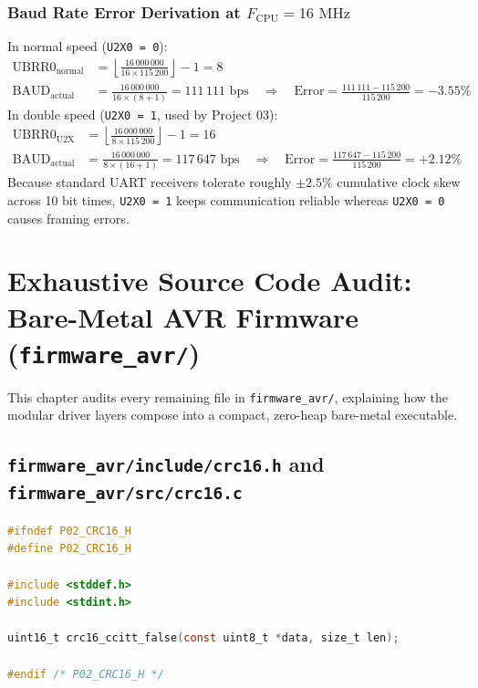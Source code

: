 \documentclass[11pt,a4paper,oneside]{report}
\begin{document}
\subsection{Baud Rate Error Derivation at $F_{\text{CPU}} = 16\text{ MHz}$}
In normal speed (\texttt{U2X0 = 0}):
\begin{align}
\text{UBRR0}_{\text{normal}} &= \left\lfloor \frac{16\,000\,000}{16 \times 115\,200} \right\rfloor - 1 = 8 \\
\text{BAUD}_{\text{actual}}  &= \frac{16\,000\,000}{16 \times (8 + 1)} = 111\,111\text{ bps} \quad \Longrightarrow \quad \text{Error} = \frac{111\,111 - 115\,200}{115\,200} = -3.55\%
\end{align}
In double speed (\texttt{U2X0 = 1}, used by Project 03):
\begin{align}
\text{UBRR0}_{\text{U2X}} &= \left\lfloor \frac{16\,000\,000}{8 \times 115\,200} \right\rfloor - 1 = 16 \\
\text{BAUD}_{\text{actual}} &= \frac{16\,000\,000}{8 \times (16 + 1)} = 117\,647\text{ bps} \quad \Longrightarrow \quad \text{Error} = \frac{117\,647 - 115\,200}{115\,200} = +2.12\%
\end{align}
Because standard UART receivers tolerate roughly $\pm 2.5\%$ cumulative clock skew across 10 bit times, \texttt{U2X0 = 1} keeps communication reliable whereas \texttt{U2X0 = 0} causes framing errors.


\chapter{Exhaustive Source Code Audit: Bare-Metal AVR Firmware (\texttt{firmware\_avr/})}

This chapter audits every remaining file in \texttt{firmware\_avr/}, explaining how the modular driver layers compose into a compact, zero-heap bare-metal executable.

\section{\texttt{firmware\_avr/include/crc16.h} and \texttt{firmware\_avr/src/crc16.c}}

\begin{lstlisting}[language=C,caption={Public CRC-16 header in \texttt{firmware\_avr/include/crc16.h}.}]
#ifndef P02_CRC16_H
#define P02_CRC16_H

#include <stddef.h>
#include <stdint.h>

uint16_t crc16_ccitt_false(const uint8_t *data, size_t len);

#endif /* P02_CRC16_H */
\end{lstlisting}
\end{document}

